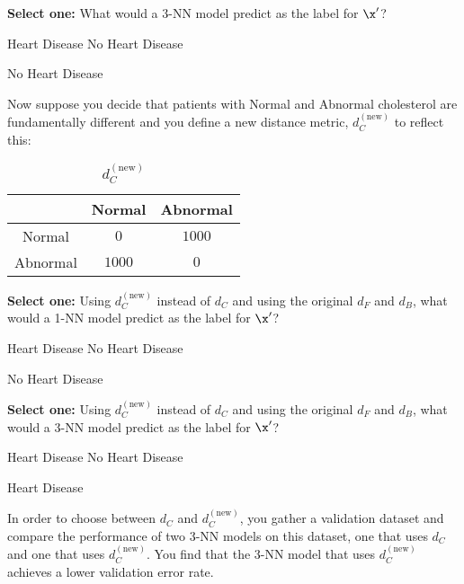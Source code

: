 \begin{parts}
\begin{subparts}
    \subpart[2] \textbf{Select one:} What would a 3-NN model predict as the label for $\x'$?
    \begin{checkboxes}
        \choice Heart Disease
        \choice No Heart Disease
    \end{checkboxes}
    \begin{soln}
        No Heart Disease
    \end{soln}

    \clearpage
    
\begin{EnvFullwidth}    
Now suppose you decide that patients with Normal and Abnormal cholesterol are fundamentally different and you define a new distance metric, $d_C^{(\textrm{new})}$ to reflect this:
\end{EnvFullwidth}

\begin{table}[h!]
    \centering
    \begin{tabular}{c|c|c|}
        & Normal & Abnormal \\ \hline
        Normal & $0$ & $1000$ \\ \hline
        Abnormal & $1000$ & $0$ \\ \hline
    \end{tabular}
    \caption*{\large $d_C^{(\textrm{new})}$}
\end{table}
    
    \subpart[1] \textbf{Select one:} Using $d_C^{(\textrm{new})}$ instead of $d_C$ and using the original $d_F$ and $d_B$, what would a 1-NN model predict as the label for $\x'$?
    \begin{checkboxes}
        \choice Heart Disease
        \choice No Heart Disease
    \end{checkboxes}
    \begin{soln}
        No Heart Disease
    \end{soln}
    
    \subpart[2] \textbf{Select one:} Using $d_C^{(\textrm{new})}$ instead of $d_C$ and using the original $d_F$ and $d_B$, what would a 3-NN model predict as the label for $\x'$?
    \begin{checkboxes}
        \choice Heart Disease
        \choice No Heart Disease
    \end{checkboxes}
    \begin{soln}
        Heart Disease
    \end{soln}
    
\begin{EnvFullwidth} 
In order to choose between $d_C$ and $d_C^{(\textrm{new})}$, you gather a validation dataset and compare the performance of two 3-NN models on this dataset, one that uses $d_C$ and one that uses $d_C^{(\textrm{new})}$. You find that the 3-NN model that uses $d_C^{(\textrm{new})}$ achieves a lower validation error rate. 
\end{EnvFullwidth}


\end{subparts}
\end{parts}
